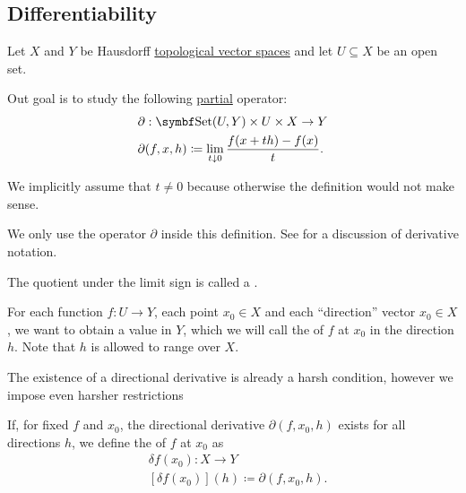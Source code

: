\subsection{Differentiability}\label{subsec:differentiability}

Let \( X \) and \( Y \) be Hausdorff \hyperref[def:topological_vector_space]{topological vector spaces} and let \( U \subseteq X \) be an open set.

\begin{definition}\label{def:differentiability}
  Out goal is to study the following \hyperref[def:function/partial]{partial} operator:
  \begin{align}\label{def:differentiability/partial_operator}
     & \partial: \Cat{Set}(U, Y) \times U \times X \to Y                             \\
     & \partial(f, x, h) \coloneqq \lim_{t \downarrow 0} \frac {f(x + th) - f(x)} t.
  \end{align}

  We implicitly assume that \( t \neq 0 \) because otherwise the definition would not make sense.

  We only use the operator \( \partial \) inside this definition. See  for a discussion of derivative notation.

  The quotient under the limit sign is called a .

  For each function \( f: U \to Y \), each point \( x_0 \in X \) and each \enquote{direction} vector \( x_0 \in X \), we want to obtain a value in \( Y \), which we will call the  of \( f \) at \( x_0 \) in the direction \( h \). Note that \( h \) is allowed to range over \( X \).

  The existence of a directional derivative is already a harsh condition, however we impose even harsher restrictions

  \begin{DefEnum}
    If, for fixed \( f \) and \( x_0 \), the directional derivative \( \partial(f, x_0, h) \) exists for all directions \( h \), we define the  of \( f \) at \( x_0 \) as
    \begin{align*}
       & \delta f(x_0): X \to Y                            \\
       & [\delta f(x_0)](h) \coloneqq \partial(f, x_0, h).
    \end{align*}


\end{DefEnum}
\end{definition}
